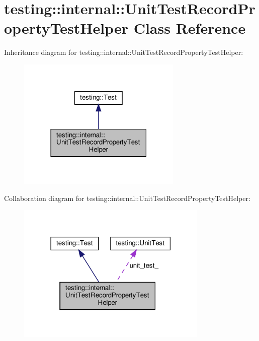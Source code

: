 \hypertarget{classtesting_1_1internal_1_1_unit_test_record_property_test_helper}{}\section{testing\+:\+:internal\+:\+:Unit\+Test\+Record\+Property\+Test\+Helper Class Reference}
\label{classtesting_1_1internal_1_1_unit_test_record_property_test_helper}


Inheritance diagram for testing\+:\+:internal\+:\+:Unit\+Test\+Record\+Property\+Test\+Helper\+:
\nopagebreak
\begin{figure}[H]
\begin{center}
\leavevmode
\includegraphics[width=222pt]{classtesting_1_1internal_1_1_unit_test_record_property_test_helper__inherit__graph}
\end{center}
\end{figure}


Collaboration diagram for testing\+:\+:internal\+:\+:Unit\+Test\+Record\+Property\+Test\+Helper\+:
\nopagebreak
\begin{figure}[H]
\begin{center}
\leavevmode
\includegraphics[width=258pt]{classtesting_1_1internal_1_1_unit_test_record_property_test_helper__coll__graph}
\end{center}
\end{figure}
